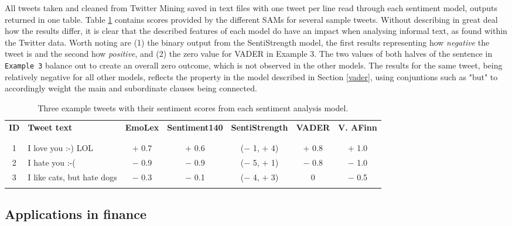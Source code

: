 \documentclass{article}
\begin{document}
All tweets taken and cleaned from Twitter Mining saved in text files with one tweet per line read through each sentiment model, outputs returned in one table. Table \ref{tab:tweet-examples} contains scores provided by the different SAMs for several sample tweets. Without describing in great deal how the results differ, it is clear that the described features of each model do have an impact when analysing informal text, as found within the Twitter data. Worth noting are (1) the binary output from the SentiStrength model, the first results representing how \emph{negative} the tweet is and the second how \emph{positive}, and (2) the zero value for VADER in Example 3. The two values of both halves of the sentence in \texttt{Example 3} balance out to create an overall zero outcome, which is not observed in the other models. The results for the same tweet, being relatively negative for all other models, reflects the property in the model described in Section \ref{vader}, using conjuntions such as "but" to accordingly weight the main and subordinate clauses being connected. 

\vspace{3mm}

\begin{table}[htb]
\centering
\begin{tabular}{clccccc}
\textbf{ID} & \textbf{Tweet text} & \textbf{EmoLex} & \textbf{Sentiment140} & \textbf{SentiStrength} & \textbf{VADER} & \textbf{V. AFinn}\\
 &  &  &  &  &  & \\
\hline
 &  &  &  &  &  & \\
1 & I love you :-) LOL & $+$ 0.7 & $+$ 0.6 & ($-$ 1, $+$ 4) & $+$ 0.8 & $+$ 1.0\\
2 & I hate you :-( & $-$ 0.9 & $-$ 0.9 & ($-$ 5, $+$ 1) & $-$ 0.8 & $-$ 1.0\\
3 & I like cats, but hate dogs & $-$ 0.3 & $-$ 0.1 & ($-$ 4, $+$ 3) & 0 & $-$ 0.5\\
 &  &  &  &  &  & \\
\end{tabular}\caption{\label{tab:tweet-examples}Three example tweets with their sentiment scores from each sentiment analysis model.}

\end{table}


\subsection{Applications in finance}
\label{sec-4-5}
\end{document}
